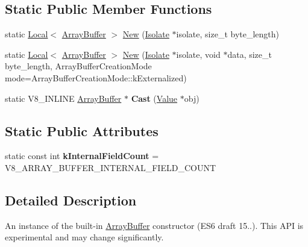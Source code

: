 \subsection*{Static Public Member Functions}
\begin{DoxyCompactItemize}
\item 
static \hyperlink{classv8_1_1Local}{Local}$<$ \hyperlink{classv8_1_1ArrayBuffer}{Array\+Buffer} $>$ \hyperlink{classv8_1_1ArrayBuffer_ad752e03d7cc7fe863656ad6183785ab7}{New} (\hyperlink{classv8_1_1Isolate}{Isolate} $\ast$isolate, size\+\_\+t byte\+\_\+length)
\item 
static \hyperlink{classv8_1_1Local}{Local}$<$ \hyperlink{classv8_1_1ArrayBuffer}{Array\+Buffer} $>$ \hyperlink{classv8_1_1ArrayBuffer_acc65e714766b0d0d791b0d43ec52d0bb}{New} (\hyperlink{classv8_1_1Isolate}{Isolate} $\ast$isolate, void $\ast$data, size\+\_\+t byte\+\_\+length, Array\+Buffer\+Creation\+Mode mode=Array\+Buffer\+Creation\+Mode\+::k\+Externalized)
\item 
static V8\+\_\+\+I\+N\+L\+I\+NE \hyperlink{classv8_1_1ArrayBuffer}{Array\+Buffer} $\ast$ {\bfseries Cast} (\hyperlink{classv8_1_1Value}{Value} $\ast$obj)\hypertarget{classv8_1_1ArrayBuffer_a4b0a703ae34217507a8ebc9cabf7336a}{}\label{classv8_1_1ArrayBuffer_a4b0a703ae34217507a8ebc9cabf7336a}

\end{DoxyCompactItemize}
\subsection*{Static Public Attributes}
\begin{DoxyCompactItemize}
\item 
static const int {\bfseries k\+Internal\+Field\+Count} = V8\+\_\+\+A\+R\+R\+A\+Y\+\_\+\+B\+U\+F\+F\+E\+R\+\_\+\+I\+N\+T\+E\+R\+N\+A\+L\+\_\+\+F\+I\+E\+L\+D\+\_\+\+C\+O\+U\+NT\hypertarget{classv8_1_1ArrayBuffer_af49000a2ea120e49da846ef02a42ac69}{}\label{classv8_1_1ArrayBuffer_af49000a2ea120e49da846ef02a42ac69}

\end{DoxyCompactItemize}


\subsection{Detailed Description}
An instance of the built-\/in \hyperlink{classv8_1_1ArrayBuffer}{Array\+Buffer} constructor (E\+S6 draft 15..). This A\+PI is experimental and may change significantly. 

